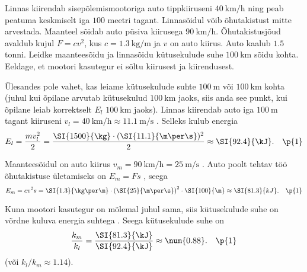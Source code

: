 
Linnas kiirendab sisepõlemismootoriga auto tippkiiruseni $\SI{40}{\km\per\hour}$ ning peab peatuma keskmiselt iga $100$ meetri tagant. Linnasõidul võib õhutakistust mitte arvestada. Maanteel sõidab auto püsiva kiirusega $\SI{90}{\km\per\hour}$. Õhutakistusjõud avaldub kujul $F=cv^2$, kus $c = \SI{1.3}{\kg\per\meter}$ ja $v$ on auto kiirus. Auto kaalub $\num{1.5}$ tonni. Leidke maanteesõidu ja linnasõidu kütusekulude suhe $\SI{100}{\km}$ sõidu kohta. Eeldage, et mootori kasutegur ei sõltu kiirusest ja kiirendusest.


\hint

\solu
Ülesandes pole vahet, kas leiame kütusekulude suhte $\SI{100}{\m}$ või $\SI{100}{\km}$ kohta  (juhul kui õpilane arvutab kütusekulud $\SI{100}{\km}$ jaoks, siis anda see punkt, kui õpilane leiab korrektselt $E_l$ $\SI{100}{\km}$ jaoks). Linnas kiirendab auto iga $\SI{100}{\m}$ tagant kiiruseni $v_l = \SI{40}{\km\per\hour} \approx \SI{11.1}{\m\per\s}$ . Selleks kulub energia
\begin{equation*}
    E_l = \frac{mv_l^2}{2} = \frac{\SI{1500}{\kg}\cdot (\SI{11.1}{\m\per\s})^2}{2} \approx \SI{92.4}{\kJ}. \quad \p{1}
\end{equation*}

Maanteesõidul on auto kiirus $v_m = \SI{90}{\km\per\hour} = \SI{25}{\m\per\s}$ . Auto poolt tehtav töö õhutakistuse ületamiseks on $E_m = Fs$ , seega
\begin{equation*}
    E_m = cv^2s = \SI{1.3}{\kg\per\m}\cdot \left(\SI{25}{\m\per\s}\right)^2 \cdot \SI{100}{\m} \approx \SI{81.3}{kJ}.\quad \p{1}
\end{equation*}

Kuna mootori kasutegur on mõlemal juhul sama, siis kütusekulude suhe on võrdne kuluva energia suhtega . Seega kütusekulude suhe on
\begin{equation*}
    \frac{k_m}{k_l} = \frac{\SI{81.3}{\kJ}}{\SI{92.4}{\kJ}} \approx \num{0.88}. \quad\p{1}
\end{equation*}
(või $k_l/k_m \approx \num{1.14}$).
\probend